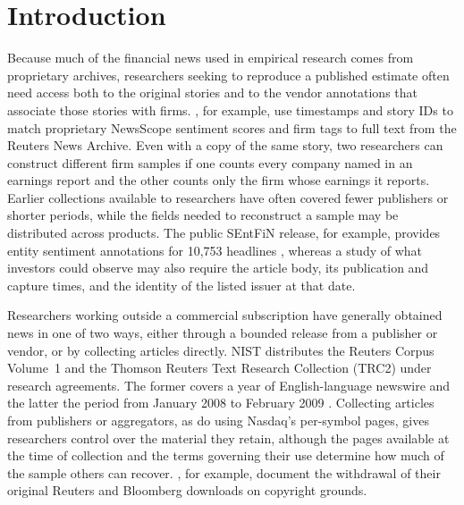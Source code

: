 \section{Introduction}
\label{sec:introduction}

Because much of the financial news used in empirical research comes
from proprietary archives, researchers seeking to reproduce a published
estimate often need access both to the original stories and to the
vendor annotations that associate those stories with firms.
\citet[Section~2]{heston2017}, for example, use timestamps and story IDs
to match proprietary NewsScope sentiment scores and firm tags to full
text from the Reuters News Archive. Even with a copy of the same story,
two researchers can construct different firm samples if one counts every
company named in an earnings report and the other counts only the firm
whose earnings it reports. Earlier collections available to researchers
have often covered fewer publishers or shorter periods, while the fields
needed to reconstruct a sample may be distributed across products.
The public SEntFiN release, for example, provides entity sentiment
annotations for 10,753 headlines \citep{sinha2022sentfin}, whereas a
study of what investors could observe may also require the article
body, its publication and capture times, and the identity of the listed
issuer at that date.

Researchers working outside a commercial subscription have generally
obtained news in one of two ways, either through a bounded release from
a publisher or vendor, or by collecting articles directly. NIST
distributes the Reuters Corpus Volume~1 and the Thomson Reuters
Text Research Collection (TRC2) under research agreements. The former
covers a year of English-language newswire and the latter the period
from January 2008 to February 2009 \citep{reuterscorpora}. Collecting
articles from publishers
or aggregators, as \citet{dong2024} do using Nasdaq's per-symbol pages,
gives researchers control over the material they retain, although the
pages available at the time of collection and the terms governing their
use determine how much of the sample others can recover.
\citet{remyding2015}, for example, document the withdrawal of their
original Reuters and Bloomberg downloads on copyright grounds.

